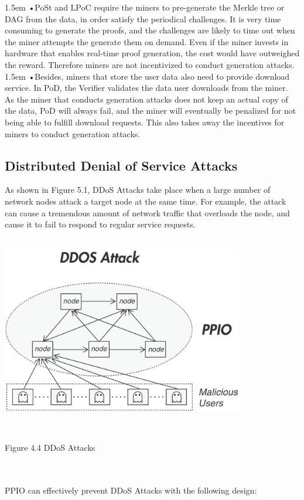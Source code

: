 \documentclass[10pt,a4paper]{article}
\begin{document}
\hangindent 1.5em
\noindent   
•\quad PoSt and LPoC require the miners to pre-generate the Merkle tree or DAG from the data, in order satisfy the periodical challenges. It is very time consuming to generate the proofs, and the challenges are likely to time out when the miner attempts the generate them on demand. Even if the miner invests in hardware that enables real-time proof generation, the cost would have outweighed the reward. Therefore miners are not incentivized to conduct generation attacks.
   \vspace{-0.8em}
\\

\hangindent 1.5em
\noindent   
•\quad Besides, miners that store the user data also need to provide download service. In PoD, the Verifier validates the data user downloads from the miner. As the miner that conducts generation attacks does not keep an actual copy of the data, PoD will always fail, and the miner will eventually be penalized for not being able to fulfill download requests. This also takes away the incentives for miners to conduct generation attacks.
   \vspace{-0.5em}


      \subsection{Distributed Denial of Service Attacks}  %
As shown in Figure 5.1, DDoS Attacks take place when a large number of network nodes attack a target node at the same time. For example, the attack can cause a tremendous amount of network traffic that overloads the node, and cause it to fail to respond to regular service requests.
   \vspace{-0.5em}
\\\\
\centerline{\includegraphics[width=300pt]{fig18}}
 \\ \centerline{{Figure 4.4 DDoS Attacks}}
    \vspace{-1.5em}
\\\\
PPIO can effectively prevent DDoS Attacks with the following design:
   \vspace{-0.8em}
\\
\end{document}
